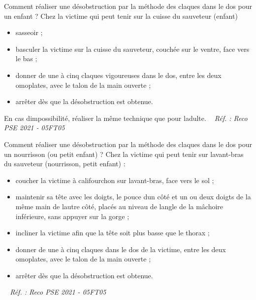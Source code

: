 \documentclass[grid,avery5371,landscape]{flashcards}
\makeatletter
\newcounter{nocarte}
\newcommand{\categ}[1]{%
  \def\@categ{#1}%
  \setcounter{nocarte}{0}%
}
\newcommand{\source}[1]{%
  \medskip
  \itshape%
   ~ \hfill Réf. : #1}
\makeatother
\begin{document}
\color[HTML]{003273}
\categ{PSE}
\begin{flashcard}[geste]{
 Comment réaliser une désobstruction par la méthode des claques dans le dos pour un enfant ?   }
  Chez la victime qui peut tenir sur la cuisse du sauveteur (enfant)\begin{itemize} 
\item sasseoir ;
\item basculer la victime sur la cuisse du sauveteur, couchée sur le ventre, face vers le bas ;
\item donner de une à cinq claques vigoureuses dans le dos, entre les deux omoplates, avec le talon de la
main ouverte ;
\item  arrêter dès que la désobstruction est obtenue. \end{itemize}
En cas dimpossibilité, réaliser la même technique que pour ladulte.
  \source{Reco PSE 2021 - 05FT05}
\end{flashcard}


\color[HTML]{003273}
\categ{PSE}
\begin{flashcard}[geste]{
 Comment réaliser une désobstruction par la méthode des claques dans le dos pour un nourrisson (ou petit enfant) ?   }
  Chez la victime qui peut tenir sur lavant-bras du sauveteur (nourrisson, petit
enfant) : \begin{itemize}
\item coucher la victime à califourchon sur lavant-bras, face vers le sol ;
\item maintenir sa tête avec les doigts, le pouce dun côté et un ou deux doigts de la même main de lautre
côté, placés au niveau de langle de la mâchoire inférieure, sans appuyer sur la gorge ;
\item incliner la victime afin que la tête soit plus basse que le thorax ;
\item donner de une à cinq claques dans le dos de la victime, entre les deux omoplates, avec le talon de la
main ouverte ;
\item arrêter dès que la désobstruction est obtenue. \end{itemize}
  \source{Reco PSE 2021 - 05FT05}
\end{flashcard}
\end{document}
